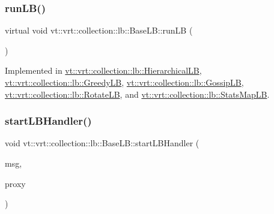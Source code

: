 \subsubsection{\texorpdfstring{run\+L\+B()}{runLB()}}
{\footnotesize\ttfamily virtual void vt\+::vrt\+::collection\+::lb\+::\+Base\+L\+B\+::run\+LB (\begin{DoxyParamCaption}{ }\end{DoxyParamCaption})\hspace{0.3cm}{\ttfamily [pure virtual]}}



Implemented in \hyperlink{structvt_1_1vrt_1_1collection_1_1lb_1_1_hierarchical_l_b_a6affae1554d9c0734db0d538b9b26e4d}{vt\+::vrt\+::collection\+::lb\+::\+Hierarchical\+LB}, \hyperlink{structvt_1_1vrt_1_1collection_1_1lb_1_1_greedy_l_b_ab5e726f6fe7aa749ea6e0e2a45171d36}{vt\+::vrt\+::collection\+::lb\+::\+Greedy\+LB}, \hyperlink{structvt_1_1vrt_1_1collection_1_1lb_1_1_gossip_l_b_a06116496c3146be18c56379775f8715d}{vt\+::vrt\+::collection\+::lb\+::\+Gossip\+LB}, \hyperlink{structvt_1_1vrt_1_1collection_1_1lb_1_1_rotate_l_b_a853cb29e5dbe8164ad96a33fade9cc44}{vt\+::vrt\+::collection\+::lb\+::\+Rotate\+LB}, and \hyperlink{structvt_1_1vrt_1_1collection_1_1lb_1_1_stats_map_l_b_a20a7bd354dcaca4393c66034be3b4083}{vt\+::vrt\+::collection\+::lb\+::\+Stats\+Map\+LB}.

\mbox{\label{structvt_1_1vrt_1_1collection_1_1lb_1_1_base_l_b_a26d684f9f07e7635886b12d0235e081e}} 
\subsubsection{\texorpdfstring{start\+L\+B\+Handler()}{startLBHandler()}}
{\footnotesize\ttfamily void vt\+::vrt\+::collection\+::lb\+::\+Base\+L\+B\+::start\+L\+B\+Handler (\begin{DoxyParamCaption}\item[{\hyperlink{structvt_1_1vrt_1_1collection_1_1balance_1_1_start_l_b_msg}{balance\+::\+Start\+L\+B\+Msg} $\ast$}]{msg,  }\item[{\hyperlink{structvt_1_1objgroup_1_1proxy_1_1_proxy}{objgroup\+::proxy\+::\+Proxy}$<$ \hyperlink{structvt_1_1vrt_1_1collection_1_1lb_1_1_base_l_b}{Base\+LB} $>$}]{proxy }\end{DoxyParamCaption})}

